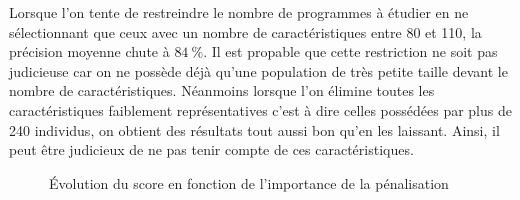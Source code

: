 \documentclass[11pt,a4paper]{article}
\begin{document}
		Lorsque l'on tente de restreindre le nombre de programmes à étudier en ne sélectionnant que ceux avec un nombre de caractéristiques entre 80 et 110, la précision moyenne chute à $\SI{84}{\percent}$. Il est propable que cette restriction ne soit pas judicieuse car on ne possède déjà qu'une population de très petite taille devant le nombre de caractéristiques. Néanmoins lorsque l'on élimine toutes les caractéristiques faiblement représentatives c'est à dire celles possédées par plus de 240 individus, on obtient des résultats tout aussi bon qu'en les laissant. Ainsi, il peut être judicieux de ne pas tenir compte de ces caractéristiques.



		\begin{figure}
			\begin{center}
			\caption{\'Evolution du score en fonction de l'importance de la pénalisation\label{fig:l1_C}}
			\end{center}
		\end{figure}
\end{document}
